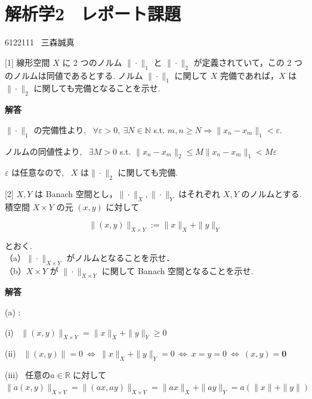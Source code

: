 \documentclass{jsarticle}
\begin{document}
\section*{解析学2 \ レポート課題}

\begin{flushright}
6122111 \ 三森誠真
\end{flushright}

\begin{itembox}[l]{[1]}
  線形空間 $X$ に 2 つのノルム $\|\cdot\|_{1}$ と $\|\cdot\|_{2}$ が定義されていて，この 2 つのノルムは同値であるとする. ノルム $\|\cdot\|_{1}$ に関して $X$ 完備であれば，$X$ は $\|\cdot\|_{2}$ に関しても完備となることを示せ.
\end{itembox}

\textbf{解答}

$\|\cdot\|_{1}$ の完備性より, \ $\forall \varepsilon > 0, \ \exists N \in \mathbb{N}$ s.t. $m, n \ge N \Longrightarrow \|x_n - x_m \|_1 < \varepsilon$.

ノルムの同値性より, \ $\exists M > 0$ s.t. $\| x_n - x_m \|_2 \le M\|x_n - x_m\|_1 < M\varepsilon$

$\varepsilon$ は任意なので, \ $X$ は$\|\cdot\|_{2}$ に関しても完備.

\bigskip
\bigskip

\begin{itembox}[l]{[2]}
 $X, Y$ は Banach 空間とし，$\|\cdot\|_{X},\|\cdot\|_{Y}$ はそれぞれ $X, Y$ のノルムとする. 積空間 $X \times Y$ の元 $(x, y)$ に対して

$$
\|(x, y)\|_{X \times Y}:=\|x\|_{X}+\|y\|_{Y}
$$

とおく.\\
（a）$\|\cdot\|_{X \times Y}$ がノルムとなることを示せ．\\
（b）$X \times Y$ が $\|\cdot\|_{X \times Y}$ に関して Banach 空間となることを示せ.\\ 
\end{itembox}

\textbf{解答}

(a) :

(i) \ $\|(x, y)\|_{X \times Y} =\|x\|_{X}+\|y\|_{Y} \ge 0$

(ii) \ $\|(x, y)\| = 0 \ \Longleftrightarrow \ \|x\|_{X}+\|y\|_{Y} = 0 \ \Longleftrightarrow \ x = y = 0 \ \Longleftrightarrow \ (x, y) = \bm{0}$

(iii) \ 任意の$a \in \mathbb{R}$ に対して $\|a(x, y)\|_{X\times Y} = \|(ax, ay)\|_{X\times Y} = \|ax\|_X + \|ay\|_Y = a(\|x\| + \|y\|)$
\end{document}

